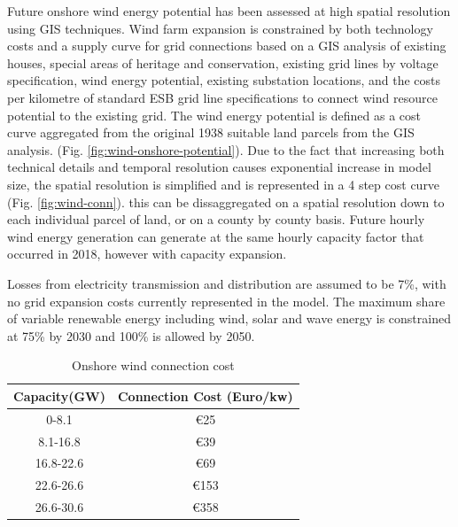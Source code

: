 \documentclass[journal abbreviation, manuscript]{copernicus}
\begin{document}
Future onshore wind energy potential has been assessed at high spatial resolution using GIS techniques. Wind farm expansion is constrained by both technology costs and a supply curve for grid connections based on a GIS analysis of existing houses, special areas of heritage and conservation, existing grid lines by voltage specification, wind energy potential, existing substation locations, and the costs per kilometre of standard ESB grid line specifications to connect wind resource potential to the existing grid. The wind energy potential is defined as a cost curve aggregated from the original 1938 suitable land parcels from the GIS analysis. (Fig. \ref{fig:wind-onshore-potential}). Due to the fact that increasing both technical details and temporal resolution causes exponential increase in model size, the spatial resolution is simplified and is represented in a 4 step cost curve (Fig. \ref{fig:wind-conn}). this can be dissaggregated on a spatial resolution down to each individual parcel of land, or on a county by county basis. Future hourly wind energy generation can generate at the same hourly capacity factor that occurred in 2018, however with capacity expansion.

Losses from electricity transmission and distribution are assumed to be 7\%, with no grid expansion costs currently represented in the model. The maximum share of variable renewable energy including wind, solar and wave energy is constrained at 75\% by 2030 and 100\% is allowed by 2050. 

\begin{table}[h]
 \centering
 \footnotesize
 \caption{Onshore wind connection cost }
 \begin{tabular}{cc}
 \hline 
 Capacity(GW) & Connection Cost (Euro/kw)\\ 
 \hline
 0-8.1 & €25 \\
 
 8.1-16.8 & €39 \\
 
 16.8-22.6 & €69 \\
 
 22.6-26.6 & €153 \\
 
 26.6-30.6 & €358 \\
 
 \hline
 \end{tabular}
 
 \label{onshore-wind-connection-cost}
\end{table}
\end{document}
